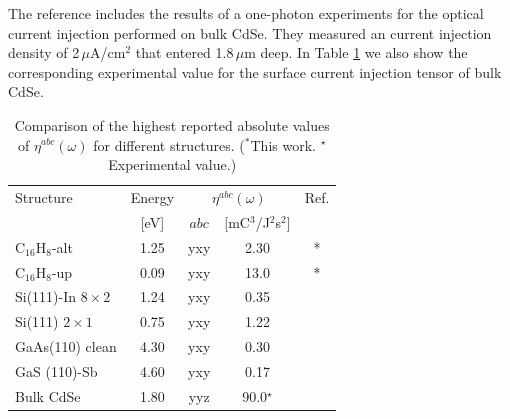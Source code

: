 \documentclass[pss]{wiley2sp} %
\begin{document}
The reference \cite{lamanAPL99} includes the results of a one-photon experiments for the optical current injection performed on bulk CdSe. They measured an current injection density of 2\,$\mu$A/cm$^{2}$ that entered 1.8\,$\mu$m deep. In Table \ref{tab:etacomp} we also show the corresponding experimental value for the surface current injection tensor of bulk CdSe.


\begin{table}%
  \sidecaption
  \begin{tabular}{lcccc}
  \hline
    Structure & Energy &  \multicolumn{2}{c}{$\eta^{abc}(\omega)$} &  Ref.\\
    \cline{3-4}
              & [eV]   & $abc$ & [mC$^{3}$/J$^{2}$s$^{2}$] \\
    \hline
    C$_{16}$H$_{8}$-alt     & 1.25  & yxy & 2.30  & *     \\
    C$_{16}$H$_{8}$-up      & 0.09  & yxy & 13.0  & *     \\
    Si(111)-In $8\times2$   & 1.24  & yxy & 0.35  & \cite{arzatePRB14}  \\
    Si(111) $2\times1$      & 0.75  & yxy & 1.22  & \cite{mendozaPRB12} \\
    GaAs(110) clean         & 4.30  & yxy & 0.30  & \cite{nastosPRB07}     \\
    GaS (110)-Sb            & 4.60  & yxy & 0.17  & \cite{cabellosPRB11}\\
    Bulk CdSe               & 1.80  & yyz & 90.0$^{\star}$  & \cite{lamanAPL99}  \\
  \hline
  \end{tabular}
  \caption[]{%
  Comparison of the highest reported absolute values of {$\eta^{abc}(\omega)$} for 
    different structures. ($^{*}$This work. $^{\star}$Experimental value.)}
  \label{tab:etacomp}
\end{table}
\end{document}
